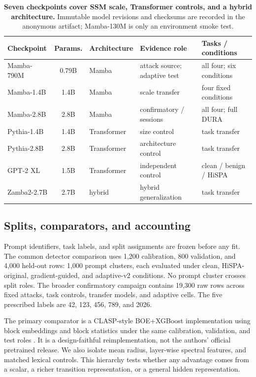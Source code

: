 \documentclass[sigconf]{acmart}
\begin{document}
\begin{table}[t]
\caption{\textbf{Seven checkpoints cover SSM scale, Transformer controls, and
a hybrid architecture.} Immutable model revisions and checksums are recorded
in the anonymous artifact; Mamba-130M is only an environment smoke test.}
\label{tab:models}
\centering\small
\begin{tabularx}{\textwidth}{@{}lclYY@{}}
\toprule
Checkpoint & Params. & Architecture & Evidence role & Tasks / conditions \\
\midrule
Mamba-790M & 0.79B & Mamba & attack source; adaptive test & all four; six conditions \\
Mamba-1.4B & 1.4B & Mamba & scale transfer & four fixed conditions \\
Mamba-2.8B & 2.8B & Mamba & confirmatory / sessions & all four; full DURA \\
Pythia-1.4B & 1.4B & Transformer & size control & task transfer \\
Pythia-2.8B & 2.8B & Transformer & architecture control & task transfer \\
GPT-2 XL & 1.5B & Transformer & independent control & clean / benign / HiSPA \\
Zamba2-2.7B & 2.7B & hybrid & hybrid generalization & task transfer \\
\bottomrule
\end{tabularx}
\end{table}

\subsection{Splits, comparators, and accounting}
Prompt identifiers, task labels, and split assignments are frozen before any
fit. The common detector comparison uses 1,200 calibration, 800 validation,
and 4,000 held-out rows: 1,000 prompt clusters, each evaluated under clean,
HiSPA-original, gradient-guided, and adaptive-v2 conditions. No prompt cluster
crosses split roles. The broader confirmatory campaign contains 19,300 raw rows
across fixed attacks, task controls, transfer models, and adaptive cells. The
five prescribed labels are 42, 123, 456, 789, and 2026.

The primary comparator is a CLASP-style BOE+XGBoost implementation using block
embeddings and block statistics under the same calibration, validation, and
test roles \cite{lemercier2026clasp}. It is a design-faithful reimplementation,
not the authors' official pretrained release. We also isolate mean radius,
layer-wise spectral features, and matched lexical controls. This hierarchy
tests whether any advantage comes from a scalar, a richer transition
representation, or a general hidden representation.
\end{document}
